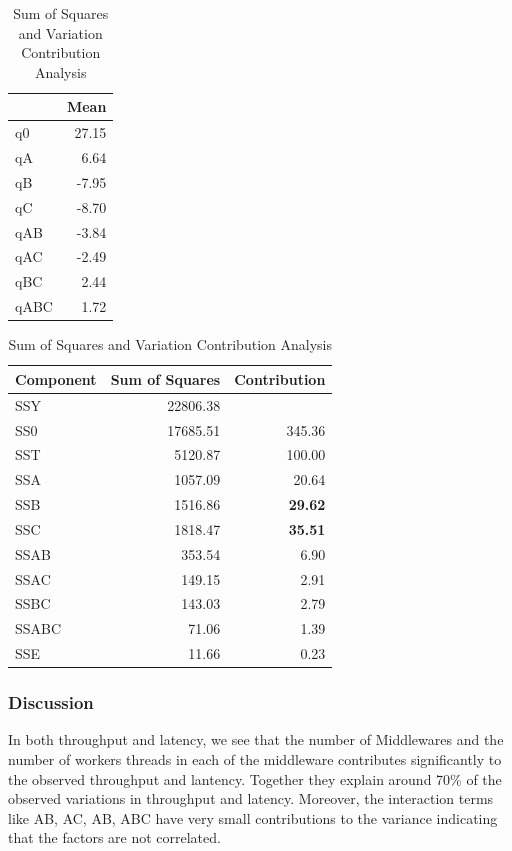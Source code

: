 \documentclass[11pt,a4paper]{article}
\begin{document}
\begin{table}[H]
	\begin{minipage}{.5\linewidth}
	\caption{Table of q values}
	\centering
	\begin{tabular}{|l|r|}
		\hline
		& \multicolumn{1}{l|}{Mean} \\ \hline
		q0 & 27.15 \\ \hline
		qA & 6.64 \\ \hline
		qB & -7.95 \\ \hline
		qC & -8.70 \\ \hline
		qAB & -3.84 \\ \hline
		qAC & -2.49 \\ \hline
		qBC & 2.44 \\ \hline
		qABC & 1.72 \\ \hline
	\end{tabular}
	\end{minipage}%
	\begin{minipage}{.5\linewidth}
	\caption{Sum of Squares and Variation Contribution Analysis}
	\centering
	\begin{tabular}{|l|r|r|}
		\hline
		Component & \multicolumn{1}{l|}{Sum of Squares} & \multicolumn{1}{l|}{Contribution} \\ \hline
		SSY & 22806.38 & \multicolumn{1}{l|}{} \\ \hline
		SS0 & 17685.51 & 345.36 \\ \hline
		SST & 5120.87 & 100.00 \\ \hline
		SSA & 1057.09 & 20.64 \\ \hline
		SSB & 1516.86 & \textbf{29.62} \\ \hline
		SSC & 1818.47 & \textbf{35.51} \\ \hline
		SSAB & 353.54 & 6.90 \\ \hline
		SSAC & 149.15 & 2.91 \\ \hline
		SSBC & 143.03 & 2.79 \\ \hline
		SSABC & 71.06 & 1.39 \\ \hline
		SSE & 11.66 & 0.23 \\ \hline
	\end{tabular}
	\end{minipage} 
\end{table}
\subsubsection{Discussion}
In both throughput and latency, we see that the number of Middlewares and the number of workers threads in each of the middleware contributes significantly to the observed throughput and lantency. Together they explain around 70\% of the observed variations in throughput and latency. Moreover, the interaction terms like AB, AC, AB, ABC have very small contributions to the variance indicating that the factors are not correlated. 
\end{document}
